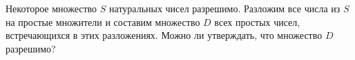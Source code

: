 Некоторое множество $S$ натуральных чисел разрешимо. Разложим все числа из $S$ на простые множители и составим множество $D$
всех простых чисел, встречающихся в этих разложениях. Можно ли утверждать, что множество $D$ разрешимо?